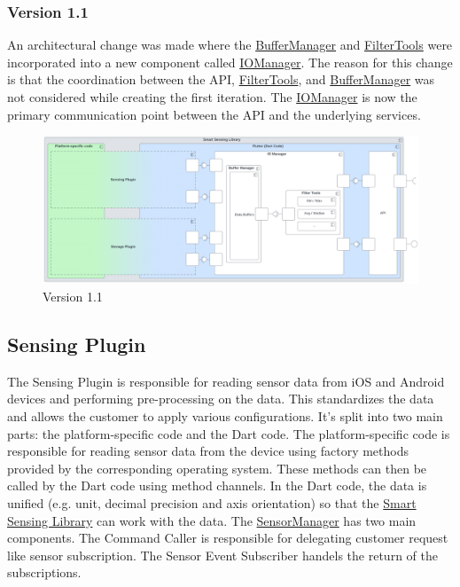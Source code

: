 \documentclass[12pt]{article}
\newcounter{fr}
\begin{document}
\subsubsection{Version 1.1}
An architectural change was made where the \hyperref[fig:bild7]{BufferManager} and \hyperref[fig:bild8]{FilterTools} were incorporated into a new component called \hyperref[fig:bild5]{IOManager}.
The reason for this change is that the coordination between the API, \hyperref[fig:bild8]{FilterTools}, and \hyperref[fig:bild7]{BufferManager} was not considered while creating the first iteration. The \hyperref[fig:bild5]{IOManager} is now the primary communication point between the API and the underlying services.
\begin{figure}[ht]
\includegraphics[width=1\textwidth]{Graphics/SmartSensingLibraryNew.png}
\caption{\label{fig:bild2} Version 1.1}
\end{figure}
\newpage
\subsection{Sensing Plugin}
The Sensing Plugin is responsible for reading sensor data from iOS and Android devices and performing pre-processing on the data. This standardizes the data and allows the customer to apply various configurations. It's split into two main parts: the platform-specific code and the Dart code. The platform-specific code is responsible for reading sensor data from the device using factory methods provided by the corresponding operating system. These methods can then be called by the Dart code using method channels. In the Dart code, the data is unified (e.g. unit, decimal precision and axis orientation) so that the \hyperref[fig:bild2]{Smart Sensing Library} can work with the data. The \hyperref[fig:bild9]{SensorManager} has two main components. The Command Caller is responsible for delegating customer request like sensor subscription. The Sensor Event Subscriber handels the return of the subscriptions.
\end{document}
